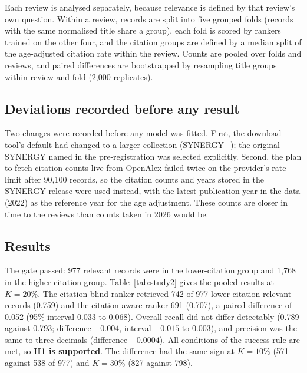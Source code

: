 \documentclass[acmsmall,screen,nonacm]{acmart}
\begin{document}
Each review is analysed separately, because relevance is defined by that review's own question. Within a
review, records are split into five grouped folds (records with the same normalised title share a
group), each fold is scored by rankers trained on the other four, and the citation groups are defined by
a median split of the age-adjusted citation rate within the review. Counts are pooled over folds and
reviews, and paired differences are bootstrapped by resampling title groups within review and fold
(2,000 replicates).

\subsection{Deviations recorded before any result}

Two changes were recorded before any model was fitted. First, the download tool's default had changed to
a larger collection (SYNERGY+); the original SYNERGY named in the pre-registration was selected
explicitly. Second, the plan to fetch citation counts live from OpenAlex failed twice on the provider's
rate limit after 90,100 records, so the citation counts and years stored in the SYNERGY release were used
instead, with the latest publication year in the data (2022) as the reference year for the age
adjustment. These counts are closer in time to the reviews than counts taken in 2026 would be.

\subsection{Results}

The gate passed: 977 relevant records were in the lower-citation group and 1,768 in the higher-citation
group. Table~\ref{tab:study2} gives the pooled results at $K = 20\%$. The citation-blind ranker retrieved
742 of 977 lower-citation relevant records (0.759) and the citation-aware ranker 691 (0.707), a paired
difference of 0.052 (95\% interval 0.033 to 0.068). Overall recall did not differ detectably (0.789
against 0.793; difference $-0.004$, interval $-0.015$ to 0.003), and precision was the same to three
decimals (difference $-0.0004$). All conditions of the success rule are met, so \textbf{H1 is supported}.
The difference had the same sign at $K = 10\%$ (571 against 538 of 977) and $K = 30\%$ (827 against 798).
\end{document}
